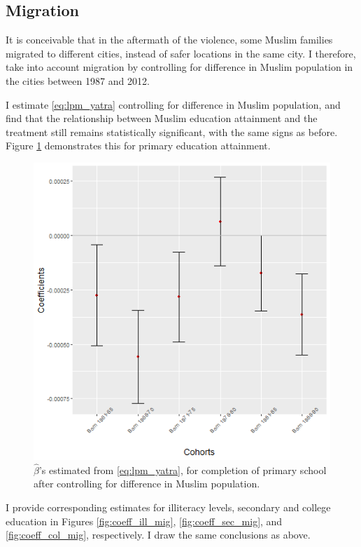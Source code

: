 \documentclass{article}
\begin{document}
\subsection{Migration}
It is conceivable that in the aftermath of the violence, some Muslim families migrated to different cities, instead of safer locations in the same city. I therefore, take into account migration by controlling for difference in Muslim population in the cities between 1987 and 2012. 

I estimate \eqref{eq:lpm_yatra} controlling for difference in Muslim population, and find that the relationship between Muslim education attainment and the treatment still remains statistically significant, with the same signs as before. Figure \ref{fig:coeff_pri_mig} demonstrates this for primary education attainment.

\begin{figure}[H]
    \centering
    \includegraphics[scale = 0.6]{images/graph_coeff_pri_mig.png}
    \caption{$\hat{\beta}$'s estimated from \eqref{eq:lpm_yatra}, for completion of primary school after controlling for difference in Muslim population.}
    \label{fig:coeff_pri_mig}
\end{figure}

I provide corresponding estimates for illiteracy levels, secondary and college education in Figures \ref{fig:coeff_ill_mig}, \ref{fig:coeff_sec_mig}, and \ref{fig:coeff_col_mig}, respectively. I draw the same conclusions as above. 
\end{document}
